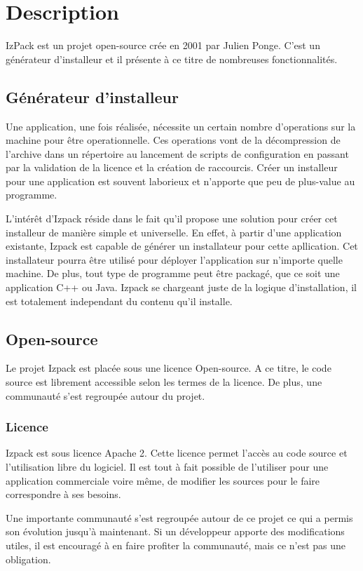 \section{Description}
IzPack est un projet open-source crée en 2001 par Julien Ponge. C'est un générateur d'installeur et il présente à ce titre de nombreuses fonctionnalités.
\subsection{Générateur d'installeur}
Une application, une fois réalisée, nécessite un certain nombre d'operations sur la machine pour être operationnelle.
Ces operations vont de la décompression de l'archive dans un répertoire au lancement de scripts de configuration en passant par la validation de la licence et la création de raccourcis.
Créer un installeur pour une application est souvent laborieux et n'apporte que peu de plus-value au programme. 

L'intérêt d'Izpack réside dans le fait qu'il propose une solution pour créer cet installeur de manière simple et universelle.
En effet, à partir d'une application existante, Izpack est capable de générer un installateur pour cette apllication. Cet installateur pourra être utilisé pour déployer l'application sur n'importe quelle machine.
De plus, tout type de programme peut être packagé, que ce soit une application C++ ou Java. Izpack se chargeant juste de la logique d'installation, il est totalement independant du contenu qu'il installe.
\subsection{Open-source}
Le projet Izpack est placée sous une licence Open-source. A ce titre, le code source est librement accessible selon les termes de la licence. De plus, une communauté s'est regroupée autour du projet.
\subsubsection{Licence}
Izpack est sous licence Apache 2. Cette licence permet l'accès au code source et l'utilisation libre du logiciel.
Il est tout à fait possible de l'utiliser pour une application commerciale voire même, de modifier les sources pour le faire correspondre à ses besoins.

Une importante communauté s'est regroupée autour de ce projet ce qui a permis son évolution jusqu'à maintenant.
Si un développeur apporte des modifications utiles, il est encouragé à en faire profiter la communauté, mais ce n'est pas une obligation.
